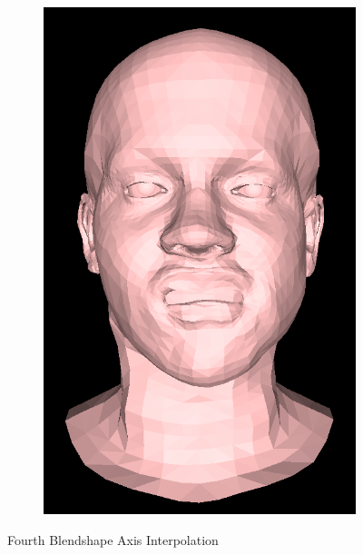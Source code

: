 \begin{figure}[h]
\begin{subfigure}[b]{0.24\textwidth}
        \includegraphics[width=\textwidth]{figures/blendshape_interp/4/00004.png}
    \end{subfigure}
    \caption{Fourth Blendshape Axis Interpolation}\label{fig:Blendshape_axis_4}
\end{figure}